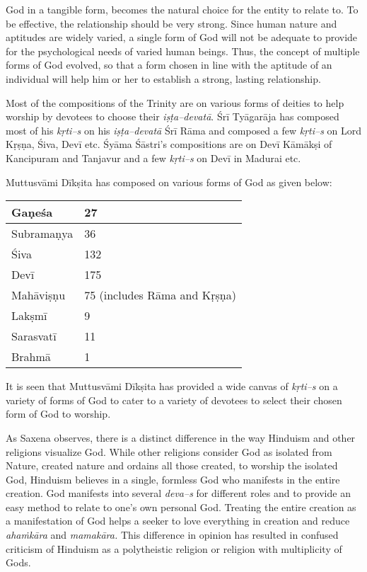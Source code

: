 God in a tangible form, becomes the natural choice for the entity to relate to. To be effective, the relationship should be very strong. Since human nature and aptitudes are widely varied, a single form of God will not be adequate to provide for the psychological needs of varied human beings. Thus, the concept of multiple forms of God evolved, so that a form chosen in line with the aptitude of an individual will help him or her to establish a strong, lasting relationship.

Most of the compositions of the Trinity are on various forms of deities to help worship by devotees to choose their \textit{iṣṭa–devatā}. Śrī Tyāgarāja has composed most of his \textit{kṛti–s} on his \textit{iṣṭa–devatā} Śrī Rāma and composed a few \textit{kṛti–s} on Lord Kṛṣṇa, Śiva, Devī etc. Śyāma Śāstri’s compositions are on Devī Kāmākṣi of Kancipuram and Tanjavur and a few \textit{kṛti–s} on Devī in Madurai etc.

Muttusvāmi Dīkṣita has composed on various forms of God as given below:

\begin{longtable}{|l|l|}
\hline
Gaṇeśa & 27 \\
\hline
Subramaṇya & 36 \\
\hline
Śiva & 132 \\
\hline
Devī & 175 \\
\hline
Mahāviṣṇu & 75 (includes Rāma and Kṛṣṇa) \\
\hline
Lakṣmī & 9 \\
\hline
Sarasvatī & 11 \\
\hline
Brahmā & 1 \\
\hline
\end{longtable}

It is seen that Muttusvāmi Dīkṣita has provided a wide canvas of \textit{kṛti–s} on a variety of forms of God to cater to a variety of devotees to select their chosen form of God to worship.

As Saxena observes, there is a distinct difference in the way Hinduism and other religions visualize God. While other religions consider God as isolated from Nature, created nature and ordains all those created, to worship the isolated God, Hinduism believes in a single, formless God who manifests in the entire creation. God manifests into several \textit{deva–s} for different roles and to provide an easy method to relate to one’s own personal God. Treating the entire creation as a manifestation of God helps a seeker to love everything in creation and reduce \textit{ahaṁkāra} and \textit{mamakāra.} This difference in opinion has resulted in confused criticism of Hinduism as a polytheistic religion or religion with multiplicity of Gods.

